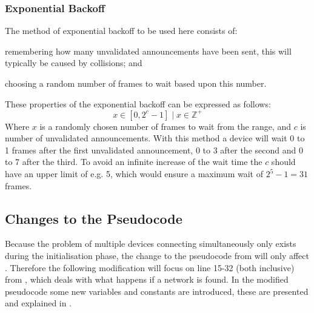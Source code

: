 \subsubsection{Exponential Backoff} %
\label{ssub:exponential_backoff}
The method of exponential backoff to be used here consists of:
\begin{enumerate*}[label=\itshape \alph*\upshape)]
    \item remembering how many unvalidated announcements have been sent, this will typically be caused by collisions; and
    \item choosing a random number of frames to wait based upon this number.   
\end{enumerate*}
These properties of the exponential backoff can be expressed as follows:
\begin{equation}
     x \in [0, 2^c - 1] \mid x \in \mathbb{Z}^+
\end{equation}
Where $x$ is a randomly chosen number of frames to wait from the range, and $c$ is number of unvalidated announcements. With this method a device will wait 0 to 1 frames after the first unvalidated announcement, 0 to 3 after the second and 0 to 7 after the third. To avoid an infinite increase of the wait time the $c$ should have an upper limit of e.g. 5, which would ensure a maximum wait of $2^5-1 = 31$ frames.


\subsection{Changes to the Pseudocode} %
\label{sub:changes_to_the_pseudocode}
Because the problem of multiple devices connecting simultaneously only exists during the initialisation phase, the change to the pseudocode from  will only affect .
Therefore the following modification will focus on line 15-32 (both inclusive) from , which deals with what happens if a network is found.
In the modified pseudocode some new variables and constants are introduced, these are presented and explained in .

